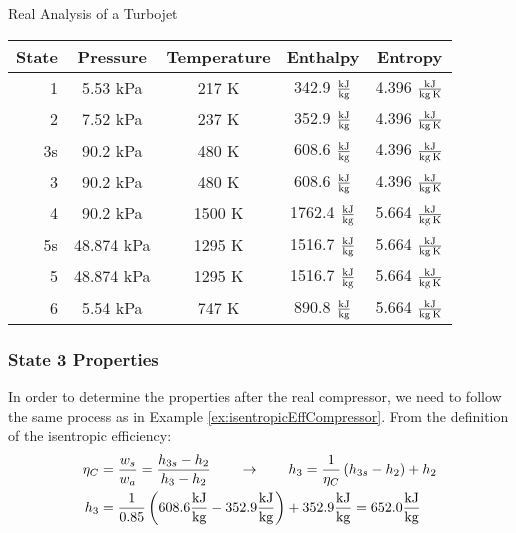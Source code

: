 \begin{example}[label=ex:turbojetReal]{Real Analysis of a Turbojet}
  \begin{table}[H]
    \centering
    \def\arraystretch{1.5}
    \begin{tabular}{r|cccc}
      State & Pressure & Temperature & Enthalpy & Entropy \\ \hline
      1 & 5.53 kPa & 217 K & 342.9 $\frac{\rm kJ}{\rm kg}$ & 4.396 $\frac{\rm kJ}{\rm kg\,K}$ \\
      2 & 7.52 kPa & 237 K & 352.9 $\frac{\rm kJ}{\rm kg}$ & 4.396 $\frac{\rm kJ}{\rm kg\,K}$ \\
      3s & 90.2 kPa & 480 K & 608.6 $\frac{\rm kJ}{\rm kg}$ & 4.396 $\frac{\rm kJ}{\rm kg\,K}$ \\
      3 & 90.2 kPa & {\color{lightgray} 480 K} & {\color{lightgray} 608.6 $\frac{\rm kJ}{\rm kg}$} & {\color{lightgray}4.396 $\frac{\rm kJ}{\rm kg\,K}$} \\
      4 & 90.2 kPa & 1500 K & 1762.4 $\frac{\rm kJ}{\rm kg}$ & 5.664 $\frac{\rm kJ}{\rm kg\,K}$ \\
      {\color{lightgray} 5s} & {\color{lightgray} 48.874 kPa} & {\color{lightgray} 1295 K} & {\color{lightgray} 1516.7 $\frac{\rm kJ}{\rm kg}$} & {\color{lightgray} 5.664 $\frac{\rm kJ}{\rm kg\,K}$} \\
      {\color{lightgray} 5} & {\color{lightgray} 48.874 kPa} & {\color{lightgray} 1295 K} & {\color{lightgray} 1516.7 $\frac{\rm kJ}{\rm kg}$} & {\color{lightgray} 5.664 $\frac{\rm kJ}{\rm kg\,K}$} \\
      6 & 5.54 kPa & {\color{lightgray} 747 K} & {\color{lightgray} 890.8 $\frac{\rm kJ}{\rm kg}$} & {\color{lightgray} 5.664 $\frac{\rm kJ}{\rm kg\,K}$}
    \end{tabular}
    \def\arraystretch{1.0}
  \end{table}
  
  \subsubsection{State 3 Properties}
  In order to determine the properties after the real compressor, we need to follow the same process as in Example \ref{ex:isentropicEffCompressor}.  From the definition of the isentropic efficiency:
  \begin{align*}
    \eta_C &= \frac{w_s}{w_a} = \frac{h_{3s}-h_2}{h_3-h_2} \qquad \rightarrow \qquad h_{3} = \frac{1}{\eta_C} \left(h_{3s} -h_2\right) + h_2 \\
    h_{3} &= \frac{1}{0.85} \left(608.6 \frac{\rm kJ}{\rm kg} - 352.9 \frac{\rm kJ}{\rm kg} \right) + 352.9 \frac{\rm kJ}{\rm kg} = 652.0 \frac{\rm kJ}{\rm kg}
  \end{align*}


\end{example}
